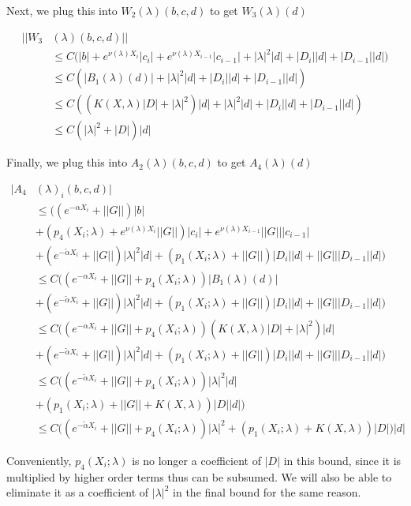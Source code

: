\documentclass[12pt]{article}
\begin{document}
Next, we plug this into $W_2(\lambda)(b, c, d)$ to get $W_3(\lambda)(d)$

\begin{align*}
||W_3&(\lambda)(b,c,d)|| \\
&\leq C \Big( |b| + e^{\nu(\lambda)X_i} |c_i| + e^{\nu(\lambda)X_{i-1}} |c_{i-1}| 
+ |\lambda|^2 |d| + |D_i||d| + |D_{i-1}||d|) \\
&\leq C( |B_1(\lambda)(d)|+ |\lambda|^2 |d| + |D_i||d| + |D_{i-1}||d|) \\
&\leq C( ( K(X, \lambda) |D|+ |\lambda|^2 )|d| + |\lambda|^2 |d| + |D_i||d| + |D_{i-1}||d|) \\
&\leq C( |\lambda|^2 + |D|)|d|
\end{align*}

Finally, we plug this into $A_2(\lambda)(b, c, d)$ to get $A_4(\lambda)(d)$

\begin{align*}
|A_4&(\lambda)_i(b, c, d)| \\
&\leq \Big( (e^{-\alpha X_i} + ||G|| )|b| \\
&+ (p_4(X_i; \lambda) + e^{\nu(\lambda)X_i} ||G||) |c_i| + e^{\nu(\lambda)X_{i-1}} ||G|| |c_{i-1}| \\
&+ (e^{-\tilde{\alpha} X_i} + ||G||)|\lambda|^2 |d| 
+ (p_1(X_i; \lambda) + ||G||) |D_i| |d| 
+ ||G|| |D_{i-1}| |d| \Big) \\
&\leq C \Big( (e^{-\alpha X_i} + ||G|| + p_4(X_i; \lambda))|B_1(\lambda)(d)|\\
&+ (e^{-\tilde{\alpha} X_i} + ||G||)|\lambda|^2 |d| 
+ (p_1(X_i; \lambda) + ||G||) |D_i| |d| 
+ ||G|| |D_{i-1}| |d| \Big) \\
&\leq C \Big( (e^{-\alpha X_i} + ||G|| + p_4(X_i; \lambda))
( K(X, \lambda) |D|+ |\lambda|^2 )|d|\\
&+ (e^{-\tilde{\alpha} X_i} + ||G||)|\lambda|^2 |d| 
+ (p_1(X_i; \lambda) + ||G||) |D_i| |d| 
+ ||G|| |D_{i-1}| |d| \Big) \\
&\leq C \Big( (e^{-\tilde{\alpha} X_i} + ||G|| + p_4(X_i; \lambda))|\lambda|^2 |d| \\ 
&+ (p_1(X_i; \lambda) + ||G|| + K(X, \lambda) ) |D| |d| \Big) \\
&\leq C \Big( (e^{-\tilde{\alpha} X_i} + ||G|| + p_4(X_i; \lambda))|\lambda|^2 + (p_1(X_i; \lambda) + K(X, \lambda) ) |D| \Big)|d|
\end{align*}

Conveniently, $p_4(X_i; \lambda)$ is no longer a coefficient of $|D|$ in this bound, since it is multiplied by higher order terms thus can be subsumed. We will also be able to eliminate it as a coefficient of $|\lambda|^2$ in the final bound for the same reason.
\end{document}
